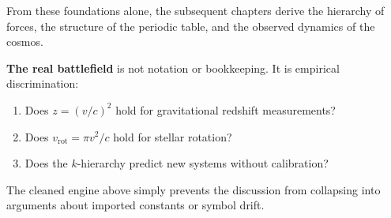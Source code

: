 From these foundations alone, the subsequent chapters derive the hierarchy of forces, the structure of the periodic table, and the observed dynamics of the cosmos.

\textbf{The real battlefield} is not notation or bookkeeping.  It is empirical discrimination:
\begin{enumerate}
  \item Does $z = (v/c)^2$ hold for gravitational redshift measurements?
  \item Does $v_{\text{rot}} = \pi v^2/c$ hold for stellar rotation?
  \item Does the $k$-hierarchy predict new systems without calibration?
\end{enumerate}

The cleaned engine above simply prevents the discussion from collapsing into arguments about imported constants or symbol drift.
